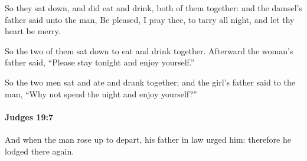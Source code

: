 			\begin{versebox}
					\item[BHS] 
					\item[ASV] So they sat down, and did eat and drink, both of them together: and the damsel's father said unto the man, Be pleased, I pray thee, to tarry all night, and let thy heart be merry.
					\item[NIV] So the two of them sat down to eat and drink together. Afterward the woman’s father said, “Please stay tonight and enjoy yourself.”
					\item[NRSV] So the two men sat and ate and drank together; and the girl’s father said to the man, “Why not spend the night and enjoy yourself?”
			\end{versebox}

		\paragraph{Judges 19:7} %
			\label{JUDGES-19-7}

			And when the man rose up to depart, his father in law urged him: therefore he lodged there again.

